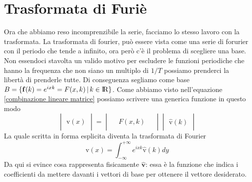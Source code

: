 \documentclass[11pt,a4paper]{report}
\newcommand{\vettore}[1]{\mathbf{#1}}
\newcommand{\vettorec}[1]{\textrm{#1}}
\theoremstyle{definition}
\theoremstyle{plain}
\theoremstyle{plain}
\begin{document}
		\section{Trasformata di Furiè}
			Ora che abbiamo reso incomprenzibile la serie, facciamo lo stesso lavoro con la trasformata.\newline \newline
			La trasformata di fourier, può essere vista come una serie di forurier con il periodo che tende a infinito, ora però c'è il problema di scegliere una base.\newline
			Non essendoci stavolta un valido motivo per escludere le funzioni periodiche che hanno la frequenza che non siano un multiplo di $1/T$ possiamo prenderci la libertà di prenderle tutte. Di conseguenza segliamo come base $B=\{\vettore f(k)=e^{ixk}=F(x,k)\,|\,k \in \rm I\!R \}$.\newline
			Come abbiamo visto nell'equazione \ref{combinazione lineare matrice} possiamo scrivere una generica funzione in questo modo
			\begin{equation}
				\begin{vmatrix}
					\\
					\vettorec v(x)\\
					\quad
				\end{vmatrix}
				=
				\begin{vmatrix}
					\, & & \, \\
					& F(x,k) & \\
					& & 
				\end{vmatrix}
				\begin{vmatrix}
					\\
					\hat{\vettorec v}(k)\\
					\quad
				\end{vmatrix}
			\end{equation}
			La quale scritta in forma esplicita diventa la trasformata di Fourier
			\begin{equation}
			\vettorec v(x)=\int_{-\infty}^{+\infty} e^{ixk}\hat{\vettorec v}(k) dy
			\end{equation}
			Da qui si evince cosa rappresenta fisicamente $\hat{\vettore v}$: essa è la funzione che indica i coefficienti da mettere davanti i vettori di base per ottenere il vettore desiderato.\newline
\end{document}

